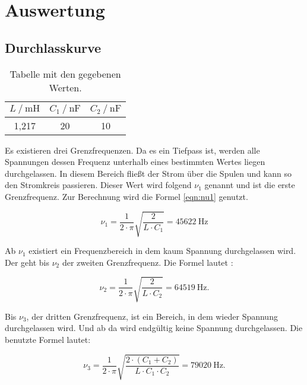 \section{Auswertung}
\label{sec:Auswertung}

\subsection{Durchlasskurve}

\begin{table}
  \centering
  \caption{Tabelle mit den gegebenen Werten.}
  \label{tab:wertedurch}
  \begin{tabular}{c c c}
    \toprule
    $L \ /\ \si{\milli\henry}$ & $C_1 \ /\ \si{\nano\farad}$ & $C_2 \ /\ \si{\nano\farad}$ \\
    \midrule
    1,217 & 20 & 10\\
    \bottomrule
  \end{tabular}
\end{table}

Es existieren drei Grenzfrequenzen. Da es ein Tiefpass ist, werden alle Spannungen
dessen Frequenz unterhalb eines bestimmten Wertes liegen durchgelassen.
In diesem Bereich fließt der Strom über die Spulen und kann so den Stromkreis
passieren. Dieser Wert
wird folgend $\nu_1$ genannt und ist die erste Grenzfrequenz.
Zur Berechnung wird die Formel \eqref{eqn:nu1} genutzt.

\begin{equation}
  \nu_1 = \frac{1}{2\cdot\pi}\sqrt{\frac{2}{L \cdot C_1}} = \SI{45622}{\hertz}
  \label{eqn:nu1}
\end{equation}

Ab $\nu_1$ existiert ein Frequenzbereich in dem kaum Spannung durchgelassen wird.
Der geht bis $\nu_2$ der zweiten Grenzfrequenz. Die Formel lautet :

\begin{equation}
  \nu_2 = \frac{1}{2\cdot\pi}\sqrt{\frac{2}{L \cdot C_2}} = \SI{64519}{\hertz}.
\end{equation}

Bis $\nu_3$, der dritten Grenzfrequenz, ist ein Bereich, in dem wieder Spannung
durchgelassen wird. Und ab da wird endgültig keine Spannung durchgelassen. Die
benutzte Formel lautet:

\begin{equation}
  \nu_3 = \frac{1}{2\cdot\pi}\sqrt{\frac{2 \cdot (C_1+C_2)}{L \cdot C_1 \cdot C_2}}
  = \SI{79020}{\hertz}.
\end{equation}


